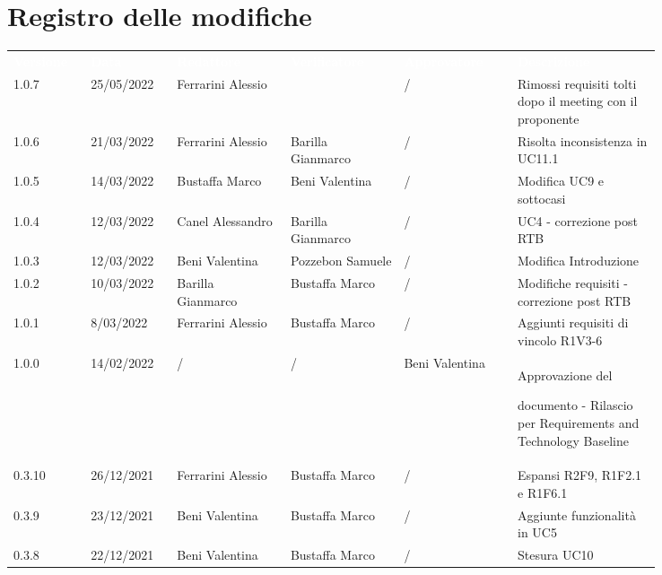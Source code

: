 \section*{Registro delle modifiche}

{\renewcommand{\arraystretch}{1.5}
\scriptsize
\begin{tabular}{p{0.10\linewidth}p{0.10\linewidth}p{0.15\linewidth}p{0.15\linewidth}p{0.15\linewidth}p{0.19\linewidth}}
	\rowcolor[RGB]{33, 73, 50}
	\textcolor{white}{\textbf{Versione}} & \textcolor{white}{\textbf{Data}} &
	\textcolor{white}{\textbf{Redattore}} & \textcolor{white}{\textbf{Verificatore}} &
	\textcolor{white}{\textbf{Approvatore}} & \textcolor{white}{\textbf{Descrizione}}\\
	\rowcolor[RGB]{233, 245, 206}
	1.0.7 & 25/05/2022 & Ferrarini Alessio & &/& Rimossi requisiti tolti dopo il
   meeting con il proponente \\
	\rowcolor[RGB]{216, 235, 171}
	1.0.6 & 21/03/2022 & Ferrarini Alessio & Barilla Gianmarco &/& Risolta inconsistenza in UC11.1\\
	\rowcolor[RGB]{233, 245, 206}
	1.0.5 & 14/03/2022 & Bustaffa Marco & Beni Valentina & / & Modifica UC9 e sottocasi\\
	\rowcolor[RGB]{216, 235, 171}
	1.0.4 & 12/03/2022 & Canel Alessandro & Barilla Gianmarco & / & UC4 - correzione post RTB\\
	\rowcolor[RGB]{233, 245, 206}
	1.0.3 & 12/03/2022 & Beni Valentina & Pozzebon Samuele & / & Modifica Introduzione\\
	\rowcolor[RGB]{216, 235, 171}
	1.0.2 & 10/03/2022 & Barilla Gianmarco & Bustaffa Marco & / & Modifiche requisiti - correzione post RTB\\
	\rowcolor[RGB]{233, 245, 206}
	1.0.1 & 8/03/2022 & Ferrarini Alessio & Bustaffa Marco  &/& Aggiunti requisiti di vincolo R1V3-6\\
	\rowcolor[RGB]{216, 235, 171}
	1.0.0 & 14/02/2022 & / & / & Beni Valentina & Approvazione del \par documento - Rilascio per Requirements and Technology Baseline\\
	\rowcolor[RGB]{233, 245, 206}
	0.3.10 & 26/12/2021 & Ferrarini Alessio & Bustaffa Marco &/& Espansi R2F9, R1F2.1 e R1F6.1\\
	\rowcolor[RGB]{216, 235, 171}
	0.3.9 & 23/12/2021 & Beni Valentina& Bustaffa Marco &/& Aggiunte funzionalità in UC5\\
	\rowcolor[RGB]{233, 245, 206}
	0.3.8 & 22/12/2021 & Beni Valentina& Bustaffa Marco &/& Stesura UC10\\

\end{tabular}}
